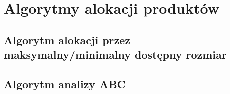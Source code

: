 \chapter{Algorytmy alokacji produktów}
\label{ca:allocationAlgorithms}

\section{Algorytm alokacji przez maksymalny/minimalny dostępny rozmiar}
	
\section{Algorytm analizy ABC}